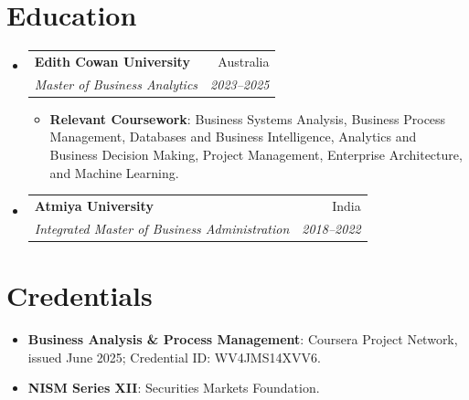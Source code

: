 \documentclass[letterpaper,9.5pt]{article}
\makeatletter
\newcommand{\resumeItem}[2]{
  \item\small{
    \textbf{#1}{: #2 \vspace{-2pt}}
  }
}
\newcommand{\resumeSubheading}[4]{
  \vspace{-1pt}\item
    \begin{tabular*}{0.97\textwidth}{l@{\extracolsep{\fill}}r}
      \textbf{#1} & #2 \\
      \textit{\small #3} & \textit{\small #4} \\
    \end{tabular*}\vspace{-5pt}
}
\newcommand{\resumeSubItem}[2]{\resumeItem{#1}{#2}\vspace{-4pt}}
\newcommand{\resumeSubHeadingListStart}{\begin{itemize}[leftmargin=*]}
\newcommand{\resumeSubHeadingListEnd}{\end{itemize}}
\newcommand{\resumeItemListStart}{\begin{itemize}}
\newcommand{\resumeItemListEnd}{\end{itemize}\vspace{-5pt}}
\makeatother
\begin{document}
\section{Education}
\resumeSubHeadingListStart
  \resumeSubheading
    {Edith Cowan University}{Australia}
    {Master of Business Analytics}{2023--2025}
    \resumeItemListStart
      \resumeItem{Relevant Coursework}
        {Business Systems Analysis, Business Process Management, Databases and Business Intelligence, Analytics and Business Decision Making, Project Management, Enterprise Architecture, and Machine Learning.}
    \resumeItemListEnd
  \resumeSubheading
    {Atmiya University}{India}
    {Integrated Master of Business Administration}{2018--2022}
\resumeSubHeadingListEnd

\section{Credentials}
\resumeSubHeadingListStart
  \resumeSubItem{Business Analysis \& Process Management}
    {Coursera Project Network, issued June 2025; Credential ID: WV4JMS14XVV6.}
  \resumeSubItem{NISM Series XII}
    {Securities Markets Foundation.}
\resumeSubHeadingListEnd
\end{document}
